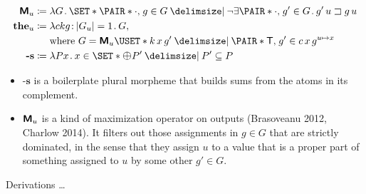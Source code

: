 \documentclass[10pt,fleqn]{article}
\newcommand{\M}{\text{\sffamily\bfseries M}}
\begin{document}
\begin{minipage}[t]{0.5\textwidth} %
\begin{spreadlines}{0pt}
\begin{align*}
  \M_u &\coloneq
  \l G \dt
    \set{%
      \pair{\cdot}{g} \in G
    \giv
      \neg\exists\pair{\cdot}{g'} \in G \dt g'\,u \sqsupset g\,u
    } \\
  \textbf{the}_u &\coloneq
    \l ckg \col |G_u| = 1 \dt G, \\
  &\hphantom{{}\coloneq{}}
    \text{where}\ 
    G = \M_u\uset{k\,x\,g' \giv \pair{\cn{T}}{g'} \in c\,x\,g^{u\mapsto x}} \\
  \textbf{-s} &\coloneq
  \l Px \dt x \in \set{\mathlarger{\oplus} P' \giv P' \subseteq P}
\end{align*}  
\end{spreadlines}
\end{minipage}
%
%
\begin{minipage}[t]{0.5\textwidth} %
\begin{spreadlines}{0pt}
  \begin{itemize}
    \item
      $\textbf{-s}$ is a boilerplate plural morpheme that builds sums from the
      atoms in its complement.
    \item
      $\M_u$ is a kind of maximization operator on outputs (Brasoveanu
      2012, Charlow 2014). It filters out those assignments in $g \in G$ that
      are strictly dominated, in the sense that they assign $u$ to a value
      that is a proper part of something assigned to $u$ by some other $g' \in
      G$.
  \end{itemize}
\end{spreadlines}
\end{minipage}

\dotbreak

Derivations \dots


\newpage

\dotbreak
\end{document}
